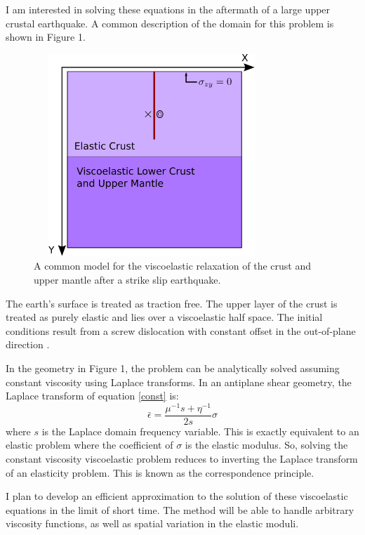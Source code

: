 \documentclass[a4paper]{article}
\begin{document}
I am interested in solving these equations in the aftermath of a large upper crustal earthquake. 
A common description of the domain for this problem is shown in Figure 1. 
\begin{figure}[h!]
  \caption{A common model for the viscoelastic relaxation of the crust and upper mantle after a strike slip earthquake.}
  \centering
    \includegraphics[width=3.5in,height=3.0in]{twolayer.png}
\end{figure}

The earth's surface is treated as traction free.
The upper layer of the crust is treated as purely elastic and lies over a viscoelastic half space.
The initial conditions result from a screw dislocation with constant offset in the out-of-plane direction \citep{Segall2010a}.

In the geometry in Figure 1, the problem can be analytically solved assuming constant viscosity using Laplace transforms.
In an antiplane shear geometry, the Laplace transform of equation \ref{const} is:
\begin{equation}
    \bar\epsilon = \frac{\mu^{-1} s + \eta^{-1}}{2s}\sigma
    \label{laplace}
\end{equation}
where $s$ is the Laplace domain frequency variable. 
This is exactly equivalent to an elastic problem where the coefficient of $\sigma$ is the elastic modulus. 
So, solving the constant viscosity viscoelastic problem reduces to inverting the Laplace transform of an elasticity
problem\citep{Nur1974}. This is known as the correspondence principle. 

I plan to develop an efficient approximation to the solution of these viscoelastic equations in the limit of short time. The
method will be able to handle arbitrary viscosity functions, as well as spatial variation in the elastic moduli. 
\end{document}
